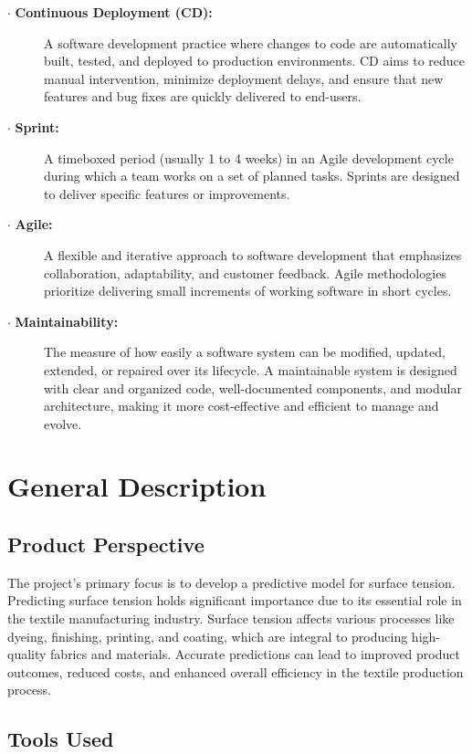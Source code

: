 \documentclass{report}
\begin{document}
\begin{description}
    \item[$\cdot$ \textbf{Continuous Deployment (CD):}] A software development practice where changes to code are automatically built, tested, and deployed to production environments. CD aims to reduce manual intervention, minimize deployment delays, and ensure that new features and bug fixes are quickly delivered to end-users.

    \item[$\cdot$ \textbf{Sprint:}] A timeboxed period (usually 1 to 4 weeks) in an Agile development cycle during which a team works on a set of planned tasks. Sprints are designed to deliver specific features or improvements.

    \item[$\cdot$ \textbf{Agile:}] A flexible and iterative approach to software development that emphasizes collaboration, adaptability, and customer feedback. Agile methodologies prioritize delivering small increments of working software in short cycles.

    \item[$\cdot$ \textbf{Maintainability:}] The measure of how easily a software system can be modified, updated, extended, or repaired over its lifecycle. A maintainable system is designed with clear and organized code, well-documented components, and modular architecture, making it more cost-effective and efficient to manage and evolve.

\end{description}



\chapter{General Description}
\section{Product Perspective}
The project's primary focus is to develop a predictive model for surface tension. Predicting surface tension holds significant importance due to its essential role in the textile manufacturing industry. Surface tension affects various processes like dyeing, finishing, printing, and coating, which are integral to producing high-quality fabrics and materials. Accurate predictions can lead to improved product outcomes, reduced costs, and enhanced overall efficiency in the textile production process.

\section{Tools Used}
\end{document}
